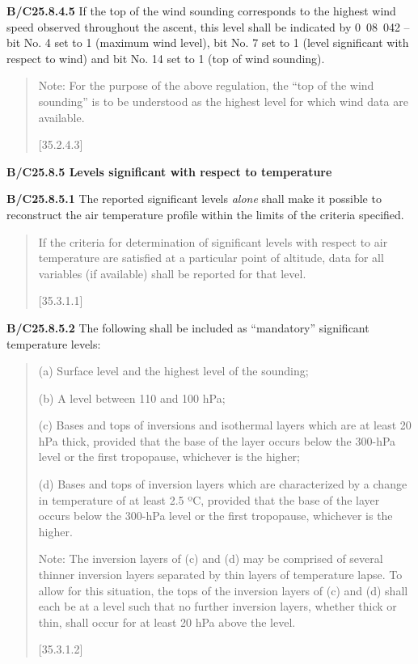 \textbf{B/C25.8.4.5} If the top of the wind sounding corresponds to the highest wind speed observed throughout the ascent, this level shall be indicated by 0~08~042 -- bit No. 4 set to 1 (maximum wind level), bit No. 7 set to 1 (level significant with respect to wind) and bit No. 14 set to 1 (top of wind sounding).

\begin{quote}
Note: For the purpose of the above regulation, the ``top of the wind sounding'' is to be understood as the highest level for which wind data are available.

{[}35.2.4.3{]}
\end{quote}

\textbf{B/C25.8.5 Levels significant with respect to temperature}

\textbf{B/C25.8.5.1} The reported significant levels \emph{alone} shall make it possible to reconstruct the air temperature profile within the limits of the criteria specified.

\begin{quote}
If the criteria for determination of significant levels with respect to air temperature are satisfied at a particular point of altitude, data for all variables (if available) shall be reported for that level.

{[}35.3.1.1{]}
\end{quote}

\textbf{B/C25.8.5.2} The following shall be included as ``mandatory'' significant temperature levels:

\begin{quote}
(a) Surface level and the highest level of the sounding;

(b) A level between 110 and 100 hPa;

(c) Bases and tops of inversions and isothermal layers which are at least 20 hPa thick, provided that the base of the layer occurs below the 300-hPa level or the first tropopause, whichever is the higher;

(d) Bases and tops of inversion layers which are characterized by a change in temperature of at least 2.5 ºC, provided that the base of the layer occurs below the 300-hPa level or the first tropopause, whichever is the higher.

Note: The inversion layers of (c) and (d) may be comprised of several thinner inversion layers separated by thin layers of temperature lapse. To allow for this situation, the tops of the inversion layers of (c) and (d) shall each be at a level such that no further inversion layers, whether thick or thin, shall occur for at least 20 hPa above the level.

{[}35.3.1.2{]}
\end{quote}

